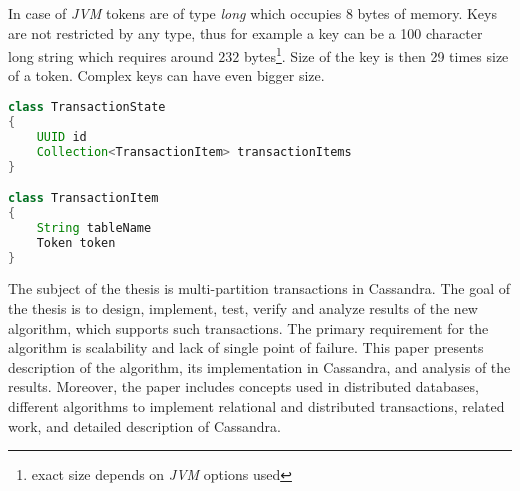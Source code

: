 In case of \emph{JVM} tokens are of type \emph{long} which occupies 8 bytes of memory. Keys are not restricted by any type, thus for example a key can be a 100 character long string which requires around $232$ bytes\footnote{exact size depends on \emph{JVM} options used}. Size of the key is then 29 times size of a token. Complex keys can have even bigger size.

\begin{lstlisting}[language=Java,style=outcode,label={lst:txState},caption={Transaction State data structure}]
class TransactionState
{
    UUID id
    Collection<TransactionItem> transactionItems    
}

class TransactionItem
{
    String tableName
    Token token
}
\end{lstlisting}


The subject of the thesis is multi-partition transactions in Cassandra. 
The goal of the thesis is to design, implement, test, verify and analyze results of the new algorithm, which supports such transactions. The primary requirement for the algorithm is scalability and lack of single point of failure. This paper presents description of the algorithm, its implementation in Cassandra, and analysis of the results. Moreover, the paper includes concepts used in distributed databases, different algorithms to implement relational and distributed transactions, related work, and detailed description of Cassandra.